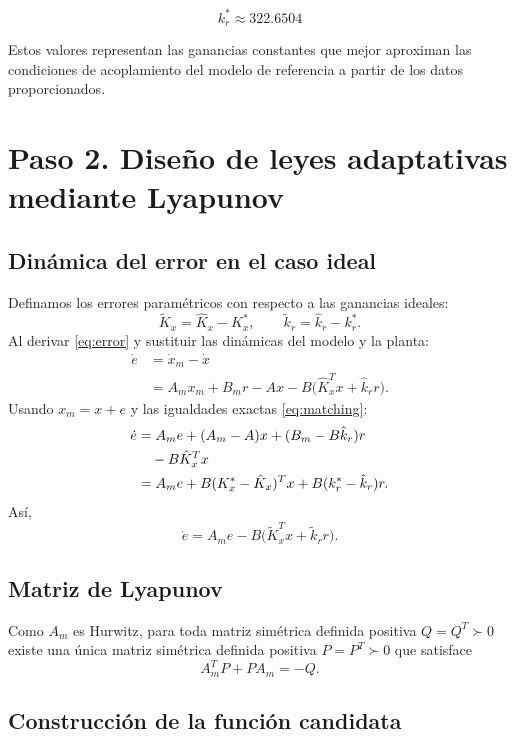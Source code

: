 \documentclass[conference,letterpaper]{IEEEtran}
\begin{document}
\begin{equation}
    \boxed{k_r^*\approx322.6504}
\end{equation}

Estos valores representan las ganancias constantes que
mejor aproximan las condiciones de acoplamiento del
modelo de referencia a partir de los datos proporcionados.

\section{Paso 2. Diseño de leyes adaptativas mediante Lyapunov}
\subsection{Dinámica del error en el caso ideal}
Definamos los errores paramétricos con respecto a las ganancias ideales:
\begin{equation}\label{eq:paramerror}
    \tilde K_x=\hat K_x-K_x^*,\qquad
    \tilde k_r=\hat k_r-k_r^*.
\end{equation}
Al derivar \eqref{eq:error} y sustituir las dinámicas del modelo y la planta:
\begin{align}
    \dot e&=\dot x_m-\dot x\\
    &=A_m x_m+B_mr-Ax-B\big(\hat K_x^Tx+\hat k_rr\big).
\end{align}
Usando $x_m=x+e$ y las igualdades exactas \eqref{eq:matching}:
\begin{align}
    \dot e&=A_me+(A_m-A)x+(B_m-B\hat k_r)r
    \notag\\ &\quad-B\hat K_x^Tx\\
    &=A_me+B(K_x^*-\hat K_x)^Tx+B(k_r^*-\hat k_r)r.
\end{align}
Así,
\begin{equation}\label{eq:errorideal}
    \boxed{\dot e=A_me-B\big(\tilde K_x^Tx+\tilde k_r r\big).}
\end{equation}

\subsection{Matriz de Lyapunov}
Como $A_m$ es Hurwitz, para toda matriz simétrica definida positiva $Q=Q^T\succ0$ existe una única matriz simétrica definida positiva $P=P^T\succ0$ que satisface
\begin{equation}\label{eq:lyapeq}
    \boxed{A_m^TP+PA_m=-Q.}
\end{equation}


\subsection{Construcción de la función candidata}
\end{document}
